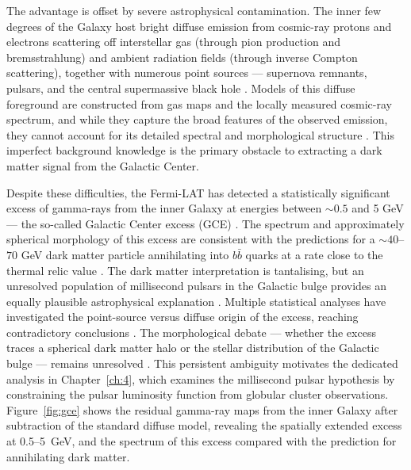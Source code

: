 The advantage is offset by severe astrophysical contamination.
The inner few degrees of the Galaxy host bright diffuse emission from cosmic-ray protons and electrons scattering off interstellar gas (through pion production and bremsstrahlung) and ambient radiation fields (through inverse Compton scattering), together with numerous point sources --- supernova remnants, pulsars, and the central supermassive black hole \cite{Hooper:2024,Cirelli:2024ssz}.
Models of this diffuse foreground are constructed from gas maps and the locally measured cosmic-ray spectrum, and while they capture the broad features of the observed emission, they cannot account for its detailed spectral and morphological structure \cite{Hooper:2024}.
This imperfect background knowledge is the primary obstacle to extracting a dark matter signal from the Galactic Center.

Despite these difficulties, the Fermi-LAT has detected a statistically significant excess of gamma-rays from the inner Galaxy at energies between $\sim 0.5$ and 5 GeV --- the so-called Galactic Center excess (GCE) \cite{Cirelli:2024ssz,Daylan:2014rsa}.
The spectrum and approximately spherical morphology of this excess are consistent with the predictions for a $\sim 40$--$70$ GeV dark matter particle annihilating into $b\bar{b}$ quarks at a rate close to the thermal relic value \cite{Cirelli:2024ssz,Daylan:2014rsa}.
The dark matter interpretation is tantalising, but an unresolved population of millisecond pulsars in the Galactic bulge provides an equally plausible astrophysical explanation \cite{Cirelli:2024ssz,Pinetti:2021jjs}.
Multiple statistical analyses have investigated the point-source versus diffuse origin of the excess, reaching contradictory conclusions \cite{Cirelli:2024ssz}.
The morphological debate --- whether the excess traces a spherical dark matter halo or the stellar distribution of the Galactic bulge --- remains unresolved \cite{Cirelli:2024ssz}.
This persistent ambiguity motivates the dedicated analysis in Chapter~\ref{ch:4}, which examines the millisecond pulsar hypothesis by constraining the pulsar luminosity function from globular cluster observations.
Figure~\ref{fig:gce} shows the residual gamma-ray maps from the inner Galaxy after subtraction of the standard diffuse model, revealing the spatially extended excess at 0.5--5~GeV, and the spectrum of this excess compared with the prediction for annihilating dark matter.

